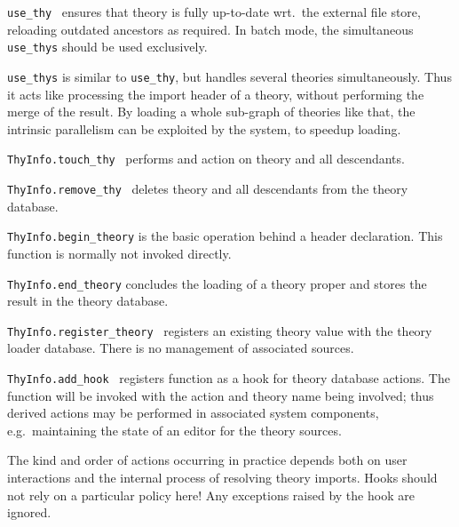 \begin{isabellebody}
\begin{isamarkuptext}
\begin{description}
  \item \verb|use_thy|~ ensures that theory  is fully
  up-to-date wrt.\ the external file store, reloading outdated
  ancestors as required.  In batch mode, the simultaneous \verb|use_thys| should be used exclusively.

  \item \verb|use_thys| is similar to \verb|use_thy|, but handles
  several theories simultaneously.  Thus it acts like processing the
  import header of a theory, without performing the merge of the
  result.  By loading a whole sub-graph of theories like that, the
  intrinsic parallelism can be exploited by the system, to speedup
  loading.

  \item \verb|ThyInfo.touch_thy|~ performs and  action
  on theory  and all descendants.

  \item \verb|ThyInfo.remove_thy|~ deletes theory  and all
  descendants from the theory database.

  \item \verb|ThyInfo.begin_theory| is the basic operation behind a
  \isa{{\isasymTHEORY}} header declaration.  This {\ML} function is
  normally not invoked directly.

  \item \verb|ThyInfo.end_theory| concludes the loading of a theory
  proper and stores the result in the theory database.

  \item \verb|ThyInfo.register_theory|~ registers an
  existing theory value with the theory loader database.  There is no
  management of associated sources.

  \item \verb|ThyInfo.add_hook|~ registers function  as a hook for theory database actions.  The function will be
  invoked with the action and theory name being involved; thus derived
  actions may be performed in associated system components, e.g.\
  maintaining the state of an editor for the theory sources.

  The kind and order of actions occurring in practice depends both on
  user interactions and the internal process of resolving theory
  imports.  Hooks should not rely on a particular policy here!  Any
  exceptions raised by the hook are ignored.

  \end{description}%
\end{isamarkuptext}%
\isamarkuptrue%
%
\endisatagmlref
{\isafoldmlref}%
%
\isadelimmlref
%
\endisadelimmlref
%
\isadelimtheory
%
\endisadelimtheory
%
\isatagtheory
{}\isamarkupfalse%
%
\endisatagtheory
{\isafoldtheory}%
%
\isadelimtheory
%
\endisadelimtheory
\isanewline
\end{isabellebody}%
